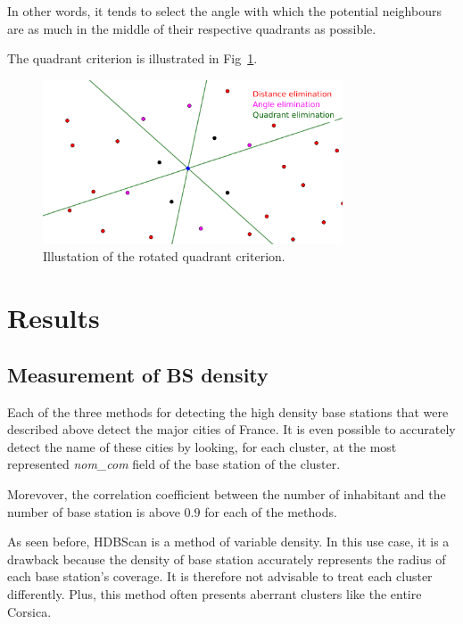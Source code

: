 \documentclass[lettersize,journal,english]{IEEEtran}
\begin{document}
            In other words, it tends to select the angle with which the potential neighbours are as much in the middle of their respective quadrants as possible.

            The quadrant criterion is illustrated in Fig~\ref{fig:crit_qua}.
            \begin{figure}
                \centering
                \includegraphics[width=3.5in]{images/illus_crit/quadrant_elim.png}
                \caption{Illustation of the rotated quadrant criterion.}
                \label{fig:crit_qua}
            \end{figure}

\section{Results\label{sec:res}}
    \subsection{Measurement of BS density}
        Each of the three methods for detecting the high density base stations that were described above detect the major cities of France. It is even possible to accurately detect the name of these cities by looking, for each cluster, at the most represented \textsl{nom\_com} field of the base station of the cluster.

        Morevover, the correlation coefficient between the number of inhabitant and the number of base station is above $0.9$ for each of the methods.

        As seen before, HDBScan is a method of variable density. In this use case, it is a drawback because the density of base station accurately represents the radius of each base station's coverage. It is therefore not advisable to treat each cluster differently. Plus, this method often presents aberrant clusters like the entire Corsica.
\end{document}
